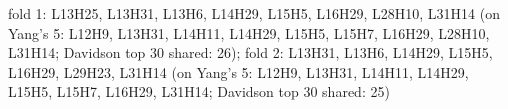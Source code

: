 fold 1: L13H25, L13H31, L13H6, L14H29, L15H5, L16H29, L28H10, L31H14 (on Yang's 5: L12H9, L13H31, L14H11, L14H29, L15H5, L15H7, L16H29, L28H10, L31H14; Davidson top 30 shared: 26); fold 2: L13H31, L13H6, L14H29, L15H5, L16H29, L29H23, L31H14 (on Yang's 5: L12H9, L13H31, L14H11, L14H29, L15H5, L15H7, L16H29, L31H14; Davidson top 30 shared: 25)
